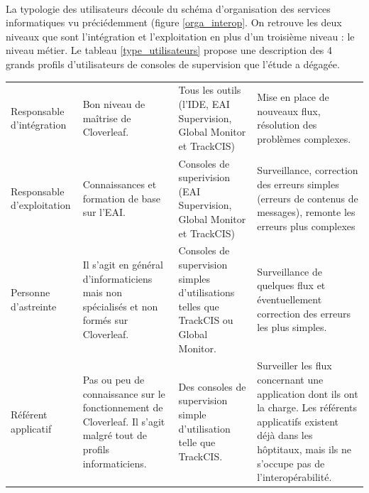 			\paragraph{}%
			La typologie des utilisateurs découle du schéma d’organisation des services
			informatiques vu préciédemment (figure \ref{orga_interop}. On retrouve les
			deux niveaux que sont l’intégration et l’exploitation en plus d’un troisième
			niveau : le niveau métier. Le tableau \ref{type_utilisateurs} propose une
			description des 4 grands profils d’utilisateurs de consoles de supervision que l’étude a dégagée.
			\begin{table}[H]
				\centering
				\begin{tabular}{| p{3cm} | p{4,5cm} | p{} | p{} |} %
					\hline
						\thead{Utilisateur}
						&\thead{Niveau de maitrise}
						&\thead{Outils utilisés}
						&\thead{Rôles}
						\\
					\hline
						Responsable d'intégration
						&
						Bon niveau de maîtrise de Cloverleaf.
						&
						Tous les outils (l'IDE, EAI Supervision, Global Monitor et TrackCIS)
						&
						Mise en place de nouveaux flux, résolution des problèmes complexes.
						\\
					\hline
						Responsable d'exploitation
						&
						Connaissances et formation de base sur l’EAI.
						&
						Consoles de superivision (EAI Supervision, Global Monitor et TrackCIS)
						&
						Surveillance, correction des erreurs simples (erreurs de contenus de
						messages), remonte les erreurs plus complexes
						\\
					\hline
						Personne d'astreinte
						&
						Il s'agit en général d'informaticiens mais non spécialisés et non formés
						sur Cloverleaf.
						&
						Consoles de supervision simples d'utilisations telles que TrackCIS ou
						Global Monitor.
						&
						Surveillance de quelques flux et éventuellement correction des erreurs les
						plus simples.
						\\
					\hline
						Référent applicatif
						&
						Pas ou peu de connaissance sur le fonctionnement de Cloverleaf. Il s'agit
						malgré tout de profils informaticiens.
						&
						Des consoles de supervision simple d'utilisation telle que TrackCIS.
						&
						Surveiller les flux concernant une application dont ils ont la charge. Les
						référents applicatifs existent déjà dans les hôptitaux, mais ils ne
						s'occupe pas de l'interopérabilité.
						\\

\end{tabular}
\end{table}
